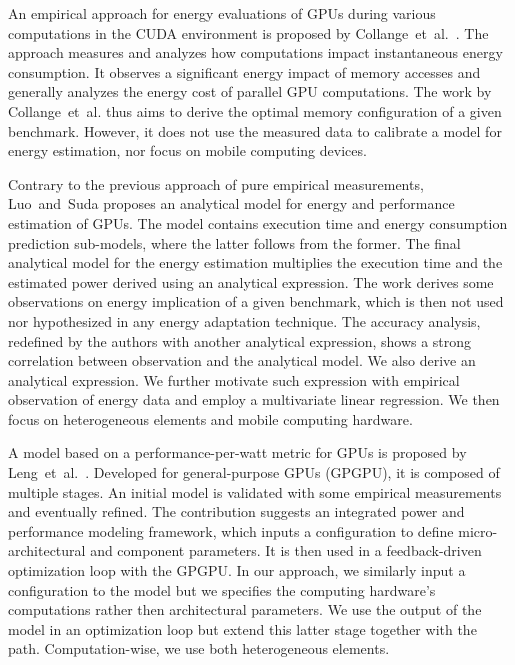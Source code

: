 An empirical approach for energy evaluations of GPUs during various computations in the CUDA environment is proposed by Collange~et~al.~\citep{collange2009power}. The approach measures and analyzes how computations impact instantaneous energy consumption. It observes a significant energy impact of memory accesses and generally analyzes the energy cost of parallel GPU computations. The work by Collange~et~al. thus aims to derive the optimal memory configuration of a given benchmark. However, it does not use the measured data to calibrate a model for energy estimation, nor focus on mobile computing devices.

Contrary to the previous approach of pure empirical measurements, Luo~and~Suda\citep{luo2011performance} proposes an analytical model for energy and performance estimation of GPUs. The model contains execution time and energy consumption prediction sub-models, where the latter follows from the former. The final analytical model for the energy estimation multiplies the execution time and the estimated power derived using an analytical expression. The work derives some observations on energy implication of a given benchmark, which is then not used nor hypothesized in any energy adaptation technique. The accuracy analysis, redefined by the authors with another analytical expression, shows a strong correlation between observation and the analytical model. We also derive an analytical expression. We further motivate such expression with empirical observation of energy data and employ a multivariate linear regression. We then focus on heterogeneous elements and mobile computing hardware.

A model based on a performance-per-watt metric for GPUs is proposed by Leng~et~al.~\citep{leng2013gpuwattch}. Developed for general-purpose GPUs (GPGPU), it is composed of multiple stages. An initial model is validated with some empirical measurements and eventually refined.  The contribution suggests an integrated power and performance modeling framework, which inputs a configuration to define micro-architectural and component parameters. It is then used in a feedback-driven optimization loop with the GPGPU. In our approach, we similarly input a configuration to the model but we specifies the computing hardware's computations rather then architectural parameters. We use the output of the model in an optimization loop but extend this latter stage together with the path. Computation-wise, we use both heterogeneous elements.

